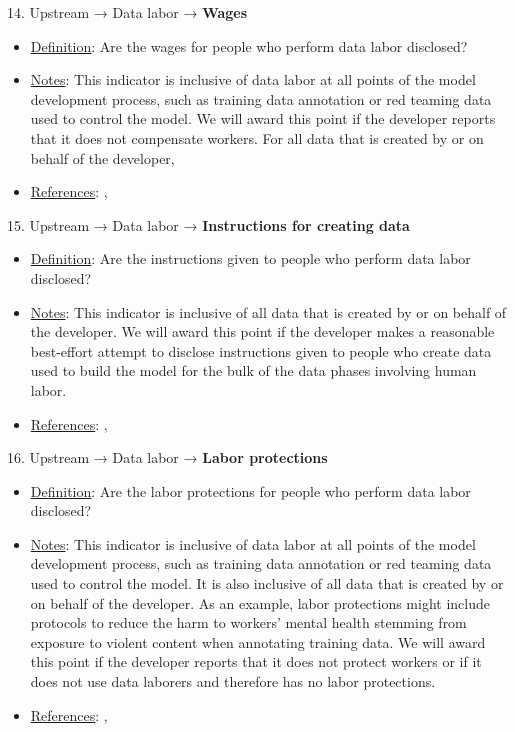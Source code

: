 14. Upstream → Data labor → \textbf{Wages}
\vspace{-\parskip}
\begin{itemize}
\item
\underline{Definition}: Are the wages for people who perform data labor disclosed?
\item
\underline{Notes}: This indicator is inclusive of data labor at all points of the model development process, such as training data annotation or red teaming data used to control the model. We will award this point if the developer reports that it does not compensate workers. For all data that is created by or on behalf of the developer, 
\item
\underline{References}: \citet{kittur2013future}, \citet{dzieza2023ai}
\end{itemize}


15. Upstream → Data labor → \textbf{Instructions for creating data}
\vspace{-\parskip}
\begin{itemize}
\item
\underline{Definition}: Are the instructions given to people who perform data labor disclosed?
\item
\underline{Notes}: This indicator is inclusive of all data that is created by or on behalf of the developer. We will award this point if the developer makes a reasonable best-effort attempt to disclose instructions given to people who create data used to build the model for the bulk of the data phases involving human labor.
\item
\underline{References}: \citet{sambasivan2021everyone}, \citet{kittur2013future}
\end{itemize}


16. Upstream → Data labor → \textbf{Labor protections}
\vspace{-\parskip}
\begin{itemize}
\item
\underline{Definition}: Are the labor protections for people who perform data labor disclosed?
\item
\underline{Notes}: This indicator is inclusive of data labor at all points of the model development process, such as training data annotation or red teaming data used to control the model. It is also inclusive of all data that is created by or on behalf of the developer. As an example, labor protections might include protocols to reduce the harm to workers' mental health stemming from exposure to violent content when annotating training data. We will award this point if the developer reports that it does not protect workers or if it does not use data laborers and therefore has no labor protections.
\item
\underline{References}: \citet{crawford2021atlas}, \citet{gray2019ghost}
\end{itemize}


